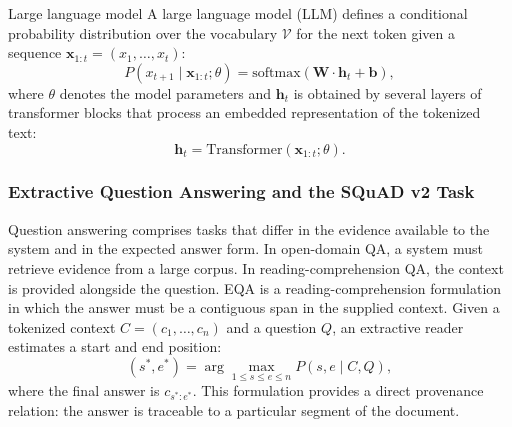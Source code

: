 \documentclass[graybox]{SNmult}
\begin{document}
\begin{overview}{Large language model}
A large language model (LLM) defines a conditional probability distribution
over the vocabulary $\mathcal{V}$ for the next token given a sequence
$\mathbf{x}_{1:t} = (x_1, \ldots, x_t)$:
\begin{equation}
P(x_{t+1} \mid \mathbf{x}_{1:t}; \theta) = \mathrm{softmax}(\mathbf{W} \cdot \mathbf{h}_t + \mathbf{b}),
\label{eq:llm-def}
\end{equation}
where $\theta$ denotes the model parameters and $\mathbf{h}_t$ is obtained by
several layers of transformer blocks that process an embedded representation of
the tokenized text:
\begin{equation}
\mathbf{h}_t = \mathrm{Transformer}(\mathbf{x}_{1:t}; \theta).
\label{eq:h-def}
\end{equation}
\end{overview}

\subsubsection{Extractive Question Answering and the SQuAD v2 Task}

Question answering comprises tasks that differ in the evidence available to the
system and in the expected answer form. In open-domain QA, a system must
retrieve evidence from a large corpus. In reading-comprehension QA, the context
is provided alongside the question. EQA is a reading-comprehension formulation
in which the answer must be a contiguous span in the supplied context. Given a
tokenized context $C=(c_1,\ldots,c_n)$ and a question $Q$, an extractive reader
estimates a start and end position:
\begin{equation}
(s^*,e^*) = \arg\max_{1 \leq s \leq e \leq n} P(s,e\mid C,Q),
\label{eq:eqa}
\end{equation}
where the final answer is $c_{s^*:e^*}$. This formulation provides a direct
provenance relation: the answer is traceable to a particular segment of the
document.
\end{document}
